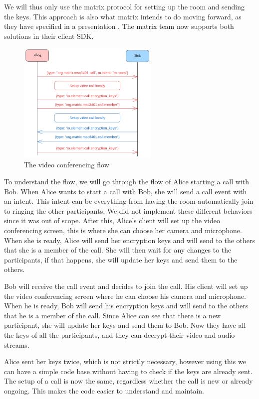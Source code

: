 \documentclass{report}
\begin{document}
We will thus only use the matrix protocol for setting up the room and sending the keys. This approach is also what
matrix intends to do moving forward, as they have specified in a presentation \cite{nirve_matrixrtc_nodate}. The
matrix team now supports both solutions in their client SDK.

\begin{figure}
\centering
\includegraphics[width=0.6\textwidth]{img/Callflow.excalidraw.png}
\caption{The video conferencing flow}
\label{fig:video-conference-flow}
\end{figure}

To understand the flow, we will go through the flow of Alice starting a call with Bob.
When Alice wants to start a call with Bob, she will send a call event with an intent. This intent can be
everything from having the room automatically join to ringing the other participants. We did not implement
these different behaviors since it was out of scope. After this, Alice's client will set up the video conferencing
screen, this is where she can choose her camera and microphone. When she is ready, Alice will send her encryption
keys and will send to the others that she is a member of the call. She will then wait for any changes to the
participants, if that happens, she will update her keys and send them to the others.

Bob will receive the call event and decides to join the call. His client will set up the video conferencing
screen where he can choose his camera and microphone. When he is ready, Bob will send his encryption keys and will
send to the others that he is a member of the call. Since Alice can see that there is a new participant, she will
update her keys and send them to Bob. Now they have all the keys of all the participants, and they can decrypt their
video and audio streams.

Alice sent her keys twice, which is not strictly necessary, however using this we can have a simple code base
without having to check if the keys are already sent. The setup of a call is now the same, regardless whether
the call is new or already ongoing. This makes the code easier to understand and maintain.
\end{document}
